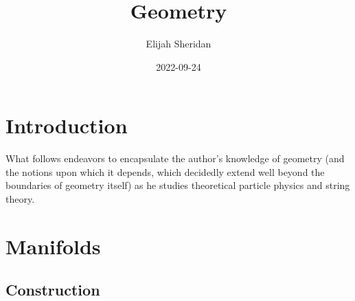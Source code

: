 \documentclass[
]{book}
\title{Geometry}
\author{Elijah Sheridan}
\date{2022-09-24}
\begin{document}
\maketitle

{
\setcounter{tocdepth}{1}
\tableofcontents
}
\hypertarget{introduction}{%
\chapter*{Introduction}\label{introduction}}

What follows endeavors to encapsulate the author's knowledge of geometry (and the notions upon which it depends, which decidedly extend well beyond the boundaries of geometry itself) as he studies theoretical particle physics and string theory.

\hypertarget{manifolds}{%
\chapter{Manifolds}\label{manifolds}}

\hypertarget{construction}{%
\section{Construction}\label{construction}}
\end{document}

